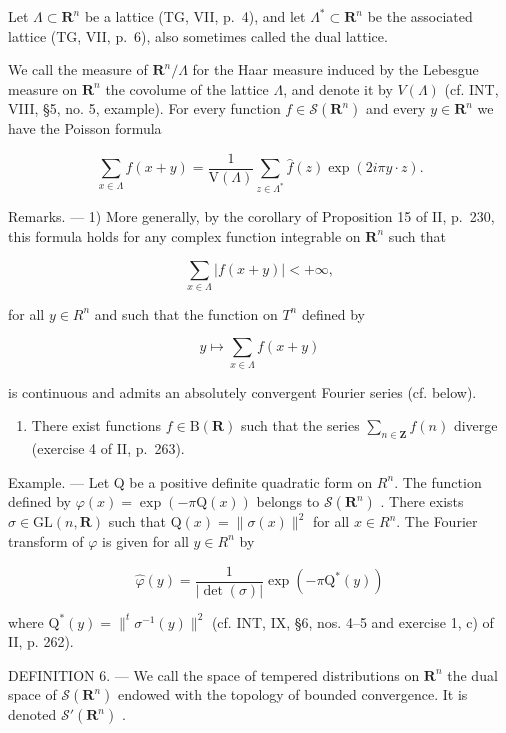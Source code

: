 Let \(\Lambda \subset \mathbf{R}^n\) be a lattice (TG, VII, p.~4), and let \(\Lambda^{*} \subset \mathbf{R}^{n}\) be the associated lattice (TG, VII, p.~6), also sometimes called the dual lattice.

We call the measure of \(\mathbf{R}^n/\Lambda\) for the Haar measure induced by the Lebesgue measure on \(\mathbf{R}^n\) the covolume of the lattice \(\Lambda\), and denote it by \(V(\Lambda)\) (cf. INT, VIII, §5, no. 5, example). For every function \(f \in \mathcal{S}(\mathbf{R}^n)\) and every \(y \in \mathbf{R}^n\) we have the Poisson formula

\[
\sum_ {x \in \Lambda} f (x + y) = \frac {1}{\mathrm{V} (\Lambda)} \sum_ {z \in \Lambda^ {*}} \widehat {f} (z) \exp (2 i \pi y \cdot z).
\]

Remarks. --- 1) More generally, by the corollary of Proposition 15 of II, p.~230, this formula holds for any complex function integrable on \(\mathbf{R}^n\) such that

\[
\sum_ {x \in \Lambda} | f (x + y) | <   + \infty ,
\]

for all \(y \in R^{n}\) and such that the function on \(T^{n}\) defined by

\[
y \mapsto \sum_ {x \in \Lambda} f (x + y)
\]

is continuous and admits an absolutely convergent Fourier series (cf. below).

\begin{enumerate}
\def\labelenumi{\arabic{enumi})}
\setcounter{enumi}{1}
\tightlist
\item
  There exist functions \(f \in \mathrm{B}(\mathbf{R})\) such that the series \(\sum_{n \in \mathbf{Z}} f(n)\) diverge (exercise 4 of II, p.~263).
\end{enumerate}

Example. --- Let Q be a positive definite quadratic form on \(R^{n}\). The function defined by \(\varphi(x)=\exp(-\pi\mathrm{Q}(x))\) belongs to \(\mathcal{S}(\mathbf{R}^{n})\) . There exists \(\sigma\in\mathrm{GL}(n,\mathbf{R})\) such that \(\mathrm{Q}(x)=\|\sigma(x)\|^{2}\) for all \(x\in R^{n}\). The Fourier transform of \(\varphi\) is given for all \(y\in R^{n}\) by

\[
\widehat {\varphi} (y) = \frac {1}{| \det (\sigma) |} \exp (- \pi \mathrm{Q} ^ {*} (y))
\]

where \(\mathrm{Q}^{*}(y)=\|^{t}\sigma^{-1}(y)\|^{2}\) (cf. INT, IX, §6, nos. 4–5 and exercise 1, c) of II, p. 262).

DEFINITION 6. --- We call the space of tempered distributions on \(\mathbf{R}^{n}\) the dual space of \(\mathcal{S}(\mathbf{R}^{n})\) endowed with the topology of bounded convergence. It is denoted \(\mathcal{S}'(\mathbf{R}^{n})\) .


